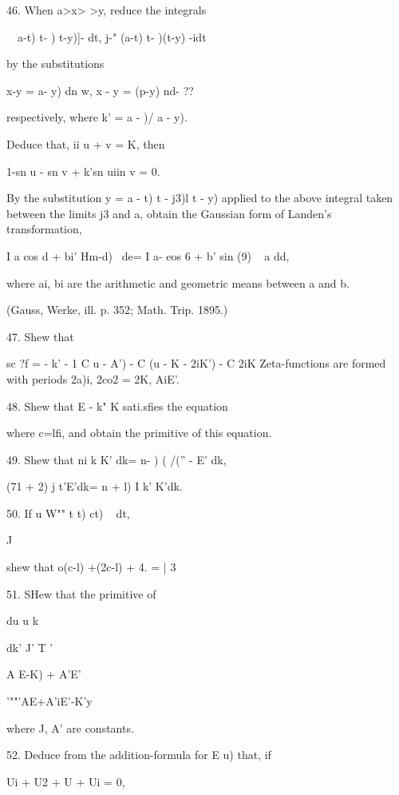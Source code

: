 46. When a>x> >y, reduce the integrals

\ \ a-t) t- ) t-y)]- dt, j-" (a-t) t- )(t-y) -idt

by the substitutions

x-y = a- y) dn w, x - y = (p-y) nd- ??

respectively, where k' = a - )/ a - y).

Deduce that, ii u + v = K, then

1-sn u - sn v + k'sn uiin v = 0.

By the substitution y = a - t) t - j3)l t - y) applied to the above
integral taken between the limits j3 and a, obtain the Gaussian form
of Landen's transformation,

I a cos d + bi' Hm-d)~ de= I a- eos 6 + b' sin (9) ~ a dd,

where ai, bi are the arithmetic and geometric means between a and b.

(Gauss, Werke, ill. p. 352; Math. Trip. 1895.)

%
%

47. Shew that

sc ?f = - k' - 1 C u - A') - C (u - K - 2iK') - C 2iK%
Zeta-functions are formed with periods 2a)i, 2co2 = 2K, AiE'.


48. Shew that E - k" K sati.sfies the equation

where c=lfi, and obtain the primitive of this equation.

49. Shew that ni k K' dk= n- ) ( /('' - E' dk,

(71 + 2) j t'E'dk= n + l) I k' K'dk. 

50. If u W"" t t) ct) ~ dt,

  J

shew that o(c-l) +(2c-l) + 4. = | 3

51. SHew that the primitive of

du u k \

dk' J' T '

A E-K) + A'E'


'""'AE+A'iE'-K'y

where J, A' are constants. 

52. Deduce from the addition-formula for E u) that, if

Ui + U2 + U + Ui = 0,

